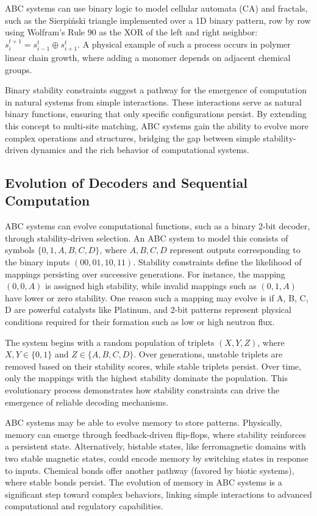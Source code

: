 \documentclass[entropy,article,submit,pdftex,moreauthors]{Definitions/mdpi}
\begin{document}
ABC systems can use binary logic to model cellular automata (CA) and fractals, such as the Sierpiński triangle implemented over a 1D binary pattern, row by row using Wolfram's Rule 90 \cite{wolfram1983statistical} as the XOR of the left and right neighbor: \( s_{i}^{t+1} = s_{i-1}^t \oplus s_{i+1}^t \). A physical example of such a process occurs in polymer linear chain growth, where adding a monomer depends on adjacent chemical groups.

Binary stability constraints suggest a pathway for the emergence of computation in natural systems from simple interactions. These interactions serve as natural binary functions, ensuring that only specific configurations persist. By extending this concept to multi-site matching, ABC systems gain the ability to evolve more complex operations and structures, bridging the gap between simple stability-driven dynamics and the rich behavior of computational systems.

\subsection{Evolution of Decoders and Sequential Computation}

ABC systems can evolve computational functions, such as a binary 2-bit decoder, through stability-driven
selection. An ABC system to model this consists of symbols \(\{0, 1, A, B, C, D\}\), where \(A, B, C, D\) represent outputs corresponding to the binary inputs \((00, 01, 10, 11)\). Stability constraints define the likelihood of mappings persisting over successive generations. For instance, the mapping \((0, 0, A)\) is assigned high stability, while invalid mappings such as \((0, 1, A)\) have lower or zero stability. One reason such a mapping may evolve is if A, B, C, D are powerful catalysts like Platinum, and 2-bit patterns represent physical conditions required for their formation such as low or high neutron flux.

The system begins with a random population of triplets \((X, Y, Z)\), where \(X, Y \in \{0, 1\}\) and \(Z \in \{A, B, C, D\}\). Over generations, unstable triplets are removed based on their stability scores, while stable triplets persist. Over time, only the mappings with the highest stability dominate the population. This evolutionary process demonstrates how stability constraints can drive the emergence of reliable decoding mechanisms.

ABC systems may be able to evolve memory to store patterns. Physically, memory can emerge through feedback-driven flip-flops, where stability reinforces a persistent state. Alternatively, bistable states, like ferromagnetic domains with two stable magnetic states, could encode memory by switching states in response to inputs. Chemical bonds offer another pathway (favored by biotic systems), where stable bonds persist. The evolution of memory in ABC systems is a significant step toward complex behaviors, linking simple interactions to advanced computational and regulatory capabilities.
\end{document}
